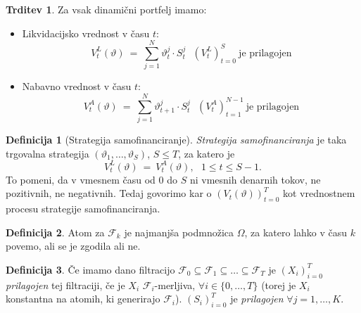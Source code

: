 \documentclass[11pt]{article}
\newcommand{\F}{\mathcal{F}}
\theoremstyle{definition}
\newtheorem{definicija}{Definicija}[section]
\theoremstyle{definition}
\newtheorem{trditev}{Trditev}[section]
\begin{document}
\begin{trditev}

Za vsak dinamični portfelj imamo:
\begin{itemize}

	\item Likvidacijsko vrednost v času $t$:
	$$V_t^L(\vartheta) ~=~ \sum_{j=1}^N \vartheta_t^j \cdot S_t^j ~~~(V_t^L)_{t=0}^S ~\text{je prilagojen}$$
	
	\item Nabavno vrednost v času $t$:
	$$V_t^A(\vartheta) ~=~ \sum_{j=1}^N \vartheta_{t+1}^j \cdot S_t^j ~~~(V_t^A)_{t=1}^{N-1} ~\text{je prilagojen}$$

\end{itemize}

\end{trditev}
\vspace{0.5cm}

\begin{definicija}[Strategija samofinanciranje]

\textit{Strategija samofinanciranja} je taka trgovalna strategija $(\vartheta_1, \ldots, \vartheta_S)$, $S \leq T$, za katero je 
$$V_t^L(\vartheta) ~=~ V_t^A(\vartheta), ~~~ 1 \leq t \leq S-1.$$
To pomeni, da v vmesnem času od $0$ do $S$ ni vmesnih denarnih tokov, ne pozitivnih, ne negativnih. Tedaj govorimo kar o $(V_t(\vartheta))_{t=0}^T$ kot vrednostnem procesu strategije samofinanciranja.

\end{definicija}
\vspace{0.5cm}

\begin{definicija}

Atom za $\F_k$ je najmanjša podmnožica $\Omega$, za katero lahko v času $k$ povemo, ali se je zgodila ali ne.

\end{definicija}
\vspace{0.5cm}

\begin{definicija}

Če imamo dano filtracijo $\F_0 \subseteq \F_1 \subseteq \ldots \subseteq \F_T$ je $(X_i)_{i=0}^T$ \textit{prilagojen} tej filtraciji, če je $X_i$ $\F_i$-merljiva, $\forall i \in \{0,\ldots, T\}$ (torej je $X_i$ konstantna na atomih, ki generirajo $\F_i$). $(S_i)_{i=0}^T$ je \textit{prilagojen} $\forall j = 1,\ldots, K$.

\end{definicija}
\vspace{0.5cm}
\end{document}
